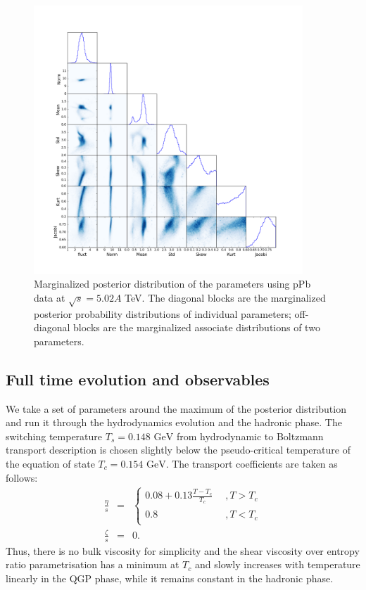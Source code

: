 \documentclass[aps,prl,twocolumn,groupedaddress]{revtex4-1}
\begin{document}
	\begin{figure}
	\begin{center}
	\includegraphics[width=0.9\textwidth]{pics/corner-pPb.png}
	\caption{Marginalized posterior distribution of the parameters using pPb data at $\sqrt{s} = 5.02 A$ TeV. The diagonal blocks are the marginalized posterior probability distributions of individual parameters; off-diagonal blocks are the marginalized associate distributions of two parameters.}\label{corner-pPb}
	\end{center}
	\end{figure}	
	
	\subsection{Full time evolution and observables}
	We take a set of parameters around the maximum of the posterior distribution and run it through the hydrodynamics evolution and the hadronic phase. 
	The switching temperature $T_s = 0.148 \textrm{ GeV}$ from hydrodynamic to Boltzmann transport description is chosen slightly below the pseudo-critical temperature of the equation of state $T_c = 0.154 \textrm{ GeV}$. The transport coefficients are taken as follows:
	\begin{eqnarray}
		\frac{\eta}{s}  & = & 
		\left\{ \begin{array}{l}
		0.08 + 0.13 \frac{T - T_c}{T_c} \phantom{0.8} , T > T_c \\
		0.8 \phantom{0.12 + 0.13 \frac{T - T_c}{T_c}}, T < T_c
		\end{array}
		\right.	\\
		\frac{\zeta}{s} &=&  0.
	\end{eqnarray}
	Thus, there is no bulk viscosity for simplicity and the shear viscosity over entropy ratio parametrisation has a minimum at $T_c$ and slowly increases with temperature linearly in the QGP phase, while it remains constant in the hadronic phase.
		
\end{document}
